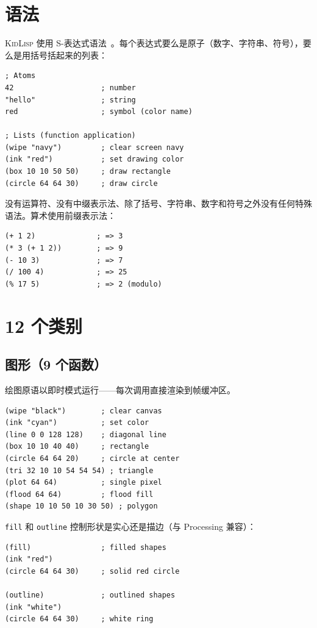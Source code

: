 \documentclass[10pt,letterpaper,twocolumn]{article}
\newcommand{\kl}{\textsc{KidLisp}}
\begin{document}
\section{语法}

\kl{} 使用 S-表达式语法~\citep{mccarthy1960recursive}。每个表达式要么是原子（数字、字符串、符号），要么是用括号括起来的列表：

\begin{lstlisting}
; Atoms
42                    ; number
"hello"               ; string
red                   ; symbol (color name)

; Lists (function application)
(wipe "navy")         ; clear screen navy
(ink "red")           ; set drawing color
(box 10 10 50 50)     ; draw rectangle
(circle 64 64 30)     ; draw circle
\end{lstlisting}

没有运算符、没有中缀表示法、除了括号、字符串、数字和符号之外没有任何特殊语法。算术使用前缀表示法：

\begin{lstlisting}
(+ 1 2)              ; => 3
(* 3 (+ 1 2))        ; => 9
(- 10 3)             ; => 7
(/ 100 4)            ; => 25
(% 17 5)             ; => 2 (modulo)
\end{lstlisting}

\section{12 个类别}

\subsection{图形（9 个函数）}

绘图原语以即时模式运行——每次调用直接渲染到帧缓冲区。

\begin{lstlisting}
(wipe "black")        ; clear canvas
(ink "cyan")          ; set color
(line 0 0 128 128)    ; diagonal line
(box 10 10 40 40)     ; rectangle
(circle 64 64 20)     ; circle at center
(tri 32 10 10 54 54 54) ; triangle
(plot 64 64)          ; single pixel
(flood 64 64)         ; flood fill
(shape 10 10 50 10 30 50) ; polygon
\end{lstlisting}

\texttt{fill} 和 \texttt{outline} 控制形状是实心还是描边（与 Processing 兼容）：

\begin{lstlisting}
(fill)                ; filled shapes
(ink "red")
(circle 64 64 30)     ; solid red circle

(outline)             ; outlined shapes
(ink "white")
(circle 64 64 30)     ; white ring
\end{lstlisting}
\end{document}
